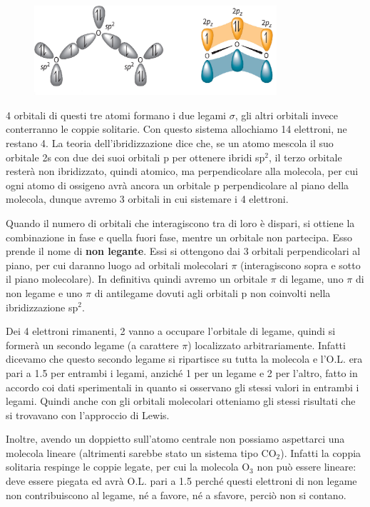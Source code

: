 \begin{figure}[htp]
    \centering
    \includegraphics[width=9cm]{immagini/orbitali_ibridi_O_3.png}
\end{figure}

4 orbitali di questi tre atomi formano i due legami $\sigma$, gli altri orbitali invece conterranno le coppie solitarie. Con questo sistema allochiamo 14 elettroni, ne restano 4. La teoria dell'ibridizzazione dice che, se un atomo mescola il suo orbitale 2s con due dei suoi orbitali p per ottenere ibridi sp$^2$, il terzo orbitale resterà non ibridizzato, quindi atomico, ma perpendicolare alla molecola, per cui ogni atomo di ossigeno avrà ancora un orbitale p perpendicolare al piano della molecola, dunque avremo 3 orbitali in cui sistemare i 4 elettroni.

Quando il numero di orbitali che interagiscono tra di loro è dispari, si ottiene la combinazione in fase e quella fuori fase, mentre un orbitale non partecipa. Esso prende il nome di \textbf{non legante}. Essi si ottengono dai 3 orbitali perpendicolari al piano, per cui daranno luogo ad orbitali molecolari $\pi$ (interagiscono sopra e sotto il piano molecolare). In definitiva quindi avremo un orbitale $\pi$ di legame, uno $\pi$ di non legame e uno $\pi$ di antilegame dovuti agli orbitali p non coinvolti nella ibridizzazione sp$^2$.

Dei 4 elettroni rimanenti, 2 vanno a occupare l'orbitale di legame, quindi si formerà un secondo legame (a carattere $\pi$) localizzato arbitrariamente. Infatti dicevamo che questo secondo legame si ripartisce su tutta la molecola e l'O.L. era pari a 1.5 per entrambi i legami, anziché 1 per un legame e 2 per l'altro, fatto in accordo coi dati sperimentali in quanto si osservano gli stessi valori in entrambi i legami. Quindi anche con gli orbitali molecolari otteniamo gli stessi risultati che si trovavano con l'approccio di Lewis.

Inoltre, avendo un doppietto sull'atomo centrale non possiamo aspettarci una molecola lineare (altrimenti sarebbe stato un sistema tipo CO$_2$). Infatti la coppia solitaria respinge le coppie legate, per cui la molecola O$_3$ non può essere lineare: deve essere piegata ed avrà O.L. pari a 1.5 perché questi elettroni di non legame non contribuiscono al legame, né a favore, né a sfavore, perciò non si contano.

